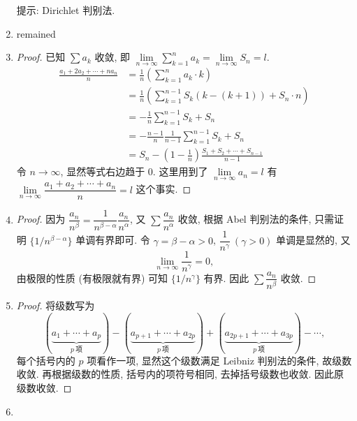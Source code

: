 \begin{enumerate}
        提示: Dirichlet 判别法.
    \item %
        {\color{red}remained}
    \item %
        \begin{proof}
            已知 $\sum a_k$ 收敛, 即 $\lim\limits_{n\to\infty}\sum\limits_{k=1}^na_k = \lim\limits_{n\to\infty}S_n = l$.
            \begin{align*}
                \frac{a_1 + 2a_2 + \cdots + na_n}{n} &= \frac1n\left(\sum_{k=1}^na_k \cdot k\right) \\
                &= \frac1n\left(\sum_{k=1}^{n-1}S_k(k - (k+1)) + S_n\cdot n\right) \\
                &= -\frac1n\sum_{k=1}^{n-1}S_k + S_n \\
                &= -\frac{n-1}{n}\frac{1}{n-1}\sum_{k=1}^{n-1}S_k + S_n \\
                &= S_n - \left(1-\frac1n\right)\frac{S_{1} + S_2 + \cdots + S_{n-1}}{n-1} 
            \end{align*}
            令 $n\to\infty$, 显然等式右边趋于 $0$. 这里用到了 $\lim\limits_{n\to\infty}a_n = l$ 有 $\lim\limits_{n\to\infty}\dfrac{a_1 + a_2 + \cdots + a_n}{n} = l$ 这个事实.
        \end{proof}
    \item %
        \begin{proof}
            因为 $\dfrac{a_n}{n^\beta} = \dfrac{1}{n^{\beta-\alpha}}\dfrac{a_n}{n^\alpha}$, 又 $\sum\dfrac{a_n}{n^\alpha}$ 收敛, 根据 Abel 判别法的条件, 只需证明 $\{1/n^{\beta-\alpha}\}$ 单调有界即可.
            令 $\gamma = \beta - \alpha > 0$, $\dfrac{1}{n^\gamma}\ (\gamma > 0)$ 单调是显然的, 又
            \[
                \lim_{n\to\infty}\frac{1}{n^\gamma} = 0,
            \]
            由极限的性质 (有极限就有界) 可知 $\{1/n^\gamma\}$ 有界. 因此 $\sum\dfrac{a_n}{n^\beta}$ 收敛.
        \end{proof}
    \item %
        \begin{proof}
            将级数写为
            \[
                (\underbrace{a_1+\cdots+a_p}_{p\ \text{项}})-(\underbrace{a_{p+1}+\cdots+a_{2p}}_{p\ \text{项}})+(\underbrace{a_{2p+1}+\cdots+a_{3p}}_{p\ \text{项}})-\cdots,    
            \]
            每个括号内的 $p$ 项看作一项, 显然这个级数满足 Leibniz 判别法的条件, 故级数收敛.
            再根据级数的性质, 括号内的项符号相同, 去掉括号级数也收敛. 因此原级数收敛.
        \end{proof}
    \item %

\end{enumerate}
